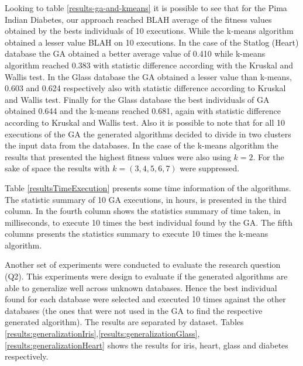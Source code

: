 \documentclass[journal]{IEEEtran}
\begin{document}
Looking to table \ref{results-ga-and-kmeans} it is possible to see that for the Pima Indian Diabetes, our approach reached BLAH average of the fitness values obtained by the bests individuals of 10 executions. While the k-means algorithm obtained a lesser value BLAH on 10 executions. 
In the case of the Statlog (Heart) database the GA obtained a better average value of 0.410 while k-means algorithm reached 0.383 with statistic difference according with the Kruskal and Wallis test.
In the Glass database the GA obtained a lesser value than k-means, 0.603 and 0.624 respectively also with statistic difference according to Kruskal and Wallis test. 
Finally for the Glass database the best individuals of GA obtained 0.644 and the k-means reached 0.681, again with statistic difference according to Kruskal and Wallis test.
Also it is possible to note that for all 10 executions of the GA the generated algorithms decided to divide in two clusters the input data from the databases. In the case of the k-means algorithm the results that presented the highest fitness values were also using $k=2$. For the sake of space the results with $k = (3,4,5,6,7)$ were suppressed.

Table \ref{resultsTimeExecution} presents some time information of the algorithms. The statistic summary of 10 GA executions, in hours, is presented in the third column. In the fourth column shows the statistics summary of time taken, in milliseconds, to execute 10 times the best individual found by the GA. The fifth columns presents the statistics summary to execute 10 times the k-means algorithm.

Another set of experiments were conducted to evaluate the research question (Q2). This experiments were design to evaluate if the generated algorithms are able to generalize well across unknown databases. Hence the best individual found for each database were selected and executed 10 times against the other databases (the ones that were not used in the GA to find the respective generated algorithm). The results are separated by dataset. Tables \ref{results:generalizationIris},\ref{results:generalizationGlass},\ref{results:generalizationHeart} shows the results for iris, heart, glass and diabetes respectively.
\end{document}

